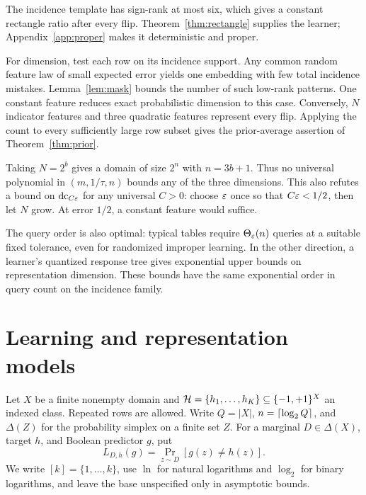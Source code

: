 \begin{proofsketch}
The incidence template has sign-rank at most six, which gives a constant rectangle ratio after every flip. Theorem~\ref{thm:rectangle} supplies the learner; Appendix~\ref{app:proper} makes it deterministic and proper.

For dimension, test each row on its incidence support. Any common random feature law of small expected error yields one embedding with few total incidence mistakes. Lemma~\ref{lem:mask} bounds the number of such low-rank patterns. One constant feature reduces exact probabilistic dimension to this case. Conversely, $N$ indicator features and three quadratic features represent every flip. Applying the count to every sufficiently large row subset gives the prior-average assertion of Theorem~\ref{thm:prior}.
\end{proofsketch}

Taking $N=2^b$ gives a domain of size $2^n$ with $n=3b+1$. Thus no universal polynomial in $(m,1/\tau,n)$ bounds any of the three dimensions. This also refutes a bound on $\operatorname{dc}_{C\varepsilon}$ for any universal $C>0$: choose $\varepsilon$ once so that $C\varepsilon<1/2$, then let $N$ grow. At error $1/2$, a constant feature would suffice.

The query order is also optimal: typical tables require $\Theta_\varepsilon(n)$ queries at a suitable fixed tolerance, even for randomized improper learning. In the other direction, a learner's quantized response tree gives exponential upper bounds on representation dimension. These bounds have the same exponential order in query count on the incidence family.

\section{Learning and representation models}\label{sec:definitions}
Let $X$ be a finite nonempty domain and $\mathcal H=\{h_1,\ldots,h_K\}\subseteq\{-1,+1\}^{X}$ an indexed class. Repeated rows are allowed. Write $Q=|X|$, $n=\lceil \log_2 Q\rceil$, and $\Delta(Z)$ for the probability simplex on a finite set $Z$. For a marginal $D\in\Delta(X)$, target $h$, and Boolean predictor $g$, put
\[
 L_{D,h}(g)=\Pr_{z\sim D}[g(z)\ne h(z)].
\]
We write $[k]=\{1,\ldots,k\}$, use $\ln$ for natural logarithms and $\log_2$ for binary logarithms, and leave the base unspecified only in asymptotic bounds.

